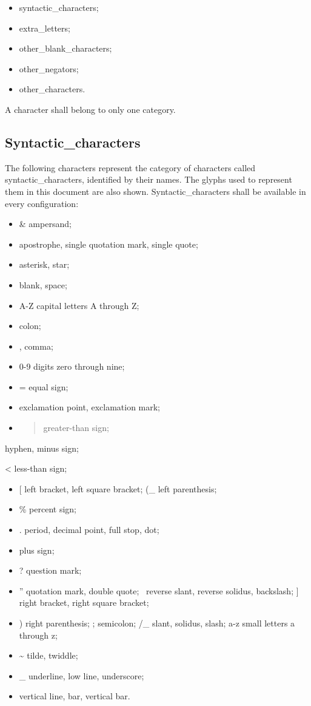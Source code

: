 \begin{itemize}
\item
  syntactic\_characters;
\item
  extra\_letters;
\item
  other\_blank\_characters;
\item
  other\_negators;
\item
  other\_characters.
\end{itemize}

A character shall belong to only one category.

\subsection{Syntactic\_characters}\label{syntactic_characters}

The following characters represent the category of characters called
syntactic\_characters, identified by their names. The glyphs used to
represent them in this document are also shown. Syntactic\_characters
shall be available in every configuration:

\begin{itemize}
\item
  \& ampersand;
\item
  apostrophe, single quotation mark, single quote;
\item
  asterisk, star;
\item
  blank, space;
\item
  A-Z capital letters A through Z;
\item
  colon;
\item
  , comma;
\item
  0-9 digits zero through nine;
\item
  = equal sign;
\item
  exclamation point, exclamation mark;
\item
  \begin{quote}
  greater-than sign;
  \end{quote}
\end{itemize}

hyphen, minus sign;

\textless{} less-than sign;

\begin{itemize}
\item
  {[} left bracket, left square bracket; (\_ left parenthesis;
\item
  \% percent sign;
\item
  . period, decimal point, full stop, dot;
\item
  plus sign;
\item
  ? question mark;
\item
  '' quotation mark, double quote; ~reverse slant, reverse solidus,
  backslash; {]} right bracket, right square bracket;
\item
  ) right parenthesis; ; semicolon; /\_ slant, solidus, slash; a-z small
  letters a through z;
\item
  \textasciitilde{} tilde, twiddle;
\item
  \_ underline, low line, underscore;
\item
  vertical line, bar, vertical bar.
\end{itemize}


